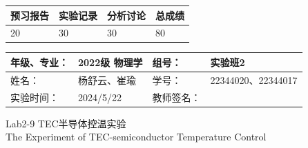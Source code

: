 \documentclass[dvipsnames, svgnames,a4paper,11pt]{article}
\begin{document}
	
	
	
	
	\begin{table}
		\renewcommand\arraystretch{1.7}
		\begin{tabularx}{\textwidth}{
				|X|X|X|X
				|X|X|X|X|}
			\hline
			\multicolumn{2}{|c|}{预习报告}&\multicolumn{2}{|c|}{实验记录}&\multicolumn{2}{|c|}{分析讨论}&\multicolumn{2}{|c|}{总成绩}\\
			\hline
			\LARGE20 & & \LARGE30 & & \LARGE30 & & \LARGE80 & \\
			\hline
		\end{tabularx}
	\end{table}
	
	\begin{table}
		\renewcommand\arraystretch{1.7}
		\begin{tabularx}{\textwidth}{|X|X|X|X|}
			\hline
			年级、专业： & 2022级 物理学 &组号： & 实验班2\\
			\hline
			姓名： & 杨舒云、崔瑜  & 学号： & 22344020、22344017\\
			\hline
			实验时间： & 2024/5/22 & 教师签名： & \\
			\hline
		\end{tabularx}
	\end{table}
	
	\begin{center}
		\LARGE Lab2-9 \quad TEC半导体控温实验\\The Experiment of TEC-semiconductor Temperature Control
	\end{center}
	
	
\end{document}
